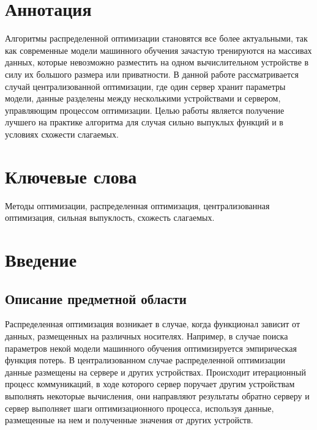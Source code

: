 \documentclass[a4paper,12pt]{extarticle}
\begin{document}
\newpage
\setcounter{page}{2}

{   

	\hypersetup{linkcolor=black}
	\tableofcontents
}

\newpage

\newpage
\section*{Аннотация}   %

Алгоритмы распределенной оптимизации становятся все более актуальными,
так как современные модели машинного обучения зачастую тренируются на массивах данных,
которые невозможно разместить на одном вычислительном устройстве в силу их большого размера или приватности.
В данной работе рассматривается случай централизованной оптимизации, где один сервер хранит параметры модели,
данные разделены между несколькими устройствами и сервером, управляющим процессом оптимизации.
Целью работы является получение лучшего на практике алгоритма
для случая сильно выпуклых функций и в условиях схожести слагаемых. 
\section*{Ключевые слова}
Методы оптимизации, распределенная оптимизация, централизованная оптимизация, сильная выпуклость, схожесть слагаемых.
\pagebreak



\section{Введение}

\subsection{Описание предметной области}
\newcommand{\zij}{z_{i}^{(j)}}
\newcommand{\lxz}{l (x, \zij)}
\newcommand{\fj}{\sum_{i=1}^{n} \lxz}
\newcommand{\R}{\mathbb{R}}

Распределенная оптимизация возникает в случае, когда функционал зависит от данных, размещенных на различных носителях.
Например, в случае поиска параметров некой модели машинного обучения оптимизируется эмпирическая функция потерь.
В централизованном случае распределенной оптимизации данные размещены на сервере и других устройствах.
Происходит итерационный процесс коммуникаций, в ходе которого сервер поручает другим устройствам выполнять некоторые вычисления,
они направляют результаты обратно серверу и сервер выполняет шаги оптимизационного процесса, используя данные,
размещенные на нем и полученные значения от других устройств.
\end{document}

